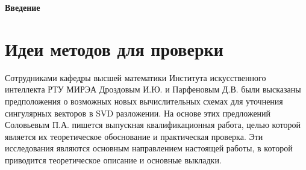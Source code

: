 \documentclass[12pt, a4paper]{report}
\begin{document}
\tableofcontents

\newpage
\begin{center}
  \textbf{\large Введение}
\end{center}



\chapter{Идеи методов для проверки}

Сотрудниками кафедры высшей математики Института искусственного интеллекта РТУ МИРЭА Дроздовым И.Ю. и Парфеновым Д.В. были высказаны предположения о возможных новых вычислительных схемах  для уточнения сингулярных векторов в SVD разложении. На основе этих предложений Соловьевым П.А. пишется выпускная квалификационная работа, целью которой является их теоретическое обоснование и практическая проверка. Эти исследования являются основным направлением настоящей работы, в которой приводится теоретическое описание и основные выкладки.
\newpage



\renewcommand{\bibname}{Использованные источники}


\end{document}

